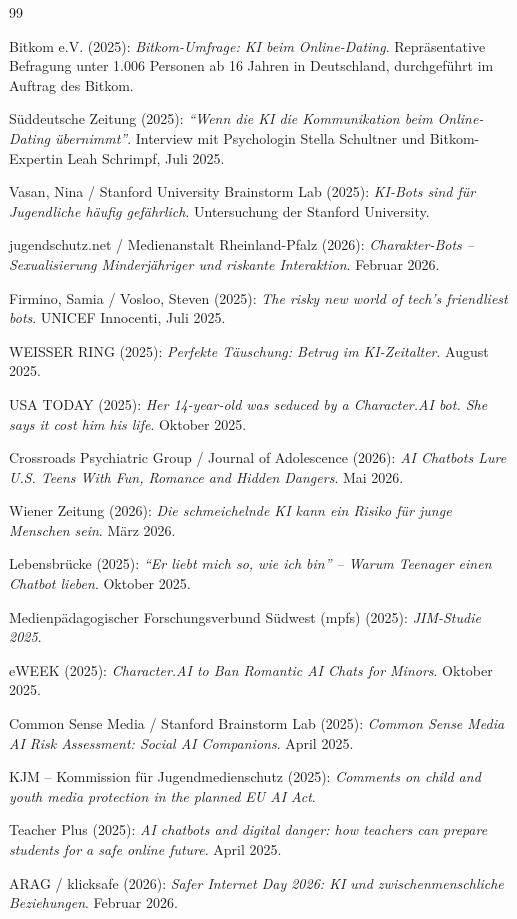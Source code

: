 \documentclass[12pt,a4paper,oneside]{scrartcl}
\begin{document}
	\newpage
	\begin{thebibliography}{99}
		
		Bitkom e.V. (2025): \emph{Bitkom-Umfrage: KI beim Online-Dating}. Repräsentative Befragung unter 1.006 Personen ab 16 Jahren in Deutschland, durchgeführt im Auftrag des Bitkom.
		
		Süddeutsche Zeitung (2025): \emph{``Wenn die KI die Kommunikation beim Online-Dating übernimmt''}. Interview mit Psychologin Stella Schultner und Bitkom-Expertin Leah Schrimpf, Juli 2025.
		
		Vasan, Nina / Stanford University Brainstorm Lab (2025): \emph{KI-Bots sind für Jugendliche häufig gefährlich}. Untersuchung der Stanford University.
		
		jugendschutz.net / Medienanstalt Rheinland-Pfalz (2026): \emph{Charakter-Bots – Sexualisierung Minderjähriger und riskante Interaktion}. Februar 2026.
		
		Firmino, Samia / Vosloo, Steven (2025): \emph{The risky new world of tech's friendliest bots}. UNICEF Innocenti, Juli 2025.
		
		WEISSER RING (2025): \emph{Perfekte Täuschung: Betrug im KI-Zeitalter}. August 2025.
		
		USA TODAY (2025): \emph{Her 14-year-old was seduced by a Character.AI bot. She says it cost him his life}. Oktober 2025.
		
		Crossroads Psychiatric Group / Journal of Adolescence (2026): \emph{AI Chatbots Lure U.S. Teens With Fun, Romance and Hidden Dangers}. Mai 2026.
		
		Wiener Zeitung (2026): \emph{Die schmeichelnde KI kann ein Risiko für junge Menschen sein}. März 2026.
		
		Lebensbrücke (2025): \emph{``Er liebt mich so, wie ich bin'' – Warum Teenager einen Chatbot lieben}. Oktober 2025.
		
		Medienpädagogischer Forschungsverbund Südwest (mpfs) (2025): \emph{JIM-Studie 2025}.
		
		eWEEK (2025): \emph{Character.AI to Ban Romantic AI Chats for Minors}. Oktober 2025.
		
		Common Sense Media / Stanford Brainstorm Lab (2025): \emph{Common Sense Media AI Risk Assessment: Social AI Companions}. April 2025.
		
		KJM – Kommission für Jugendmedienschutz (2025): \emph{Comments on child and youth media protection in the planned EU AI Act}.
		
		Teacher Plus (2025): \emph{AI chatbots and digital danger: how teachers can prepare students for a safe online future}. April 2025.
		
		ARAG / klicksafe (2026): \emph{Safer Internet Day 2026: KI und zwischenmenschliche Beziehungen}. Februar 2026.
		
	\end{thebibliography}
	
\end{document}
